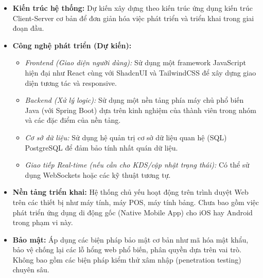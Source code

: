 \begin{itemize}
    \item \textbf{Kiến trúc hệ thống:} Dự kiến xây dựng theo kiến trúc ứng dụng kiến trúc Client-Server cơ bản để đơn giản hóa việc phát triển và triển khai trong giai đoạn đầu.
    \item \textbf{Công nghệ phát triển (Dự kiến):}
        \begin{itemize}
            \item \textit{Frontend (Giao diện người dùng):} Sử dụng một framework JavaScript hiện đại như React cùng với ShadcnUI và TailwindCSS để xây dựng giao diện tương tác và responsive.
            \item \textit{Backend (Xử lý logic):} Sử dụng một nền tảng phía máy chủ phổ biến Java (với Spring Boot) dựa trên kinh nghiệm của thành viên trong nhóm và các đặc điểm của nền tảng.
            \item \textit{Cơ sở dữ liệu:} Sử dụng hệ quản trị cơ sở dữ liệu quan hệ (SQL) PostgreSQL để đảm bảo tính nhất quán dữ liệu.
            \item \textit{Giao tiếp Real-time (nếu cần cho KDS/cập nhật trạng thái):} Có thể sử dụng WebSockets hoặc các kỹ thuật tương tự.
        \end{itemize}
    \item \textbf{Nền tảng triển khai:} Hệ thống chủ yếu hoạt động trên trình duyệt Web trên các thiết bị như máy tính, máy POS, máy tính bảng. Chưa bao gồm việc phát triển ứng dụng di động gốc (Native Mobile App) cho iOS hay Android trong phạm vi này.
    \item \textbf{Bảo mật:} Áp dụng các biện pháp bảo mật cơ bản như mã hóa mật khẩu, bảo vệ chống lại các lỗ hổng web phổ biến, phân quyền dựa trên vai trò. Không bao gồm các biện pháp kiểm thử xâm nhập (penetration testing) chuyên sâu.
\end{itemize}

